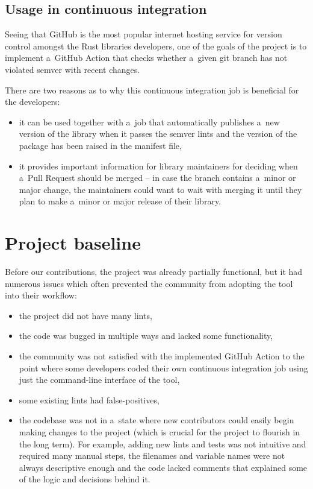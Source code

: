\documentclass[licencjacka,en]{pracamgr}
\begin{document}
\subsection{Usage in continuous integration}\label{r:subsection_usage_in_ci}

Seeing that GitHub is the most popular internet hosting service for version control amongst the
Rust libraries developers, one of the goals of the project is to implement a~GitHub Action that
checks whether a~given git branch has not violated semver with recent changes.

There are two reasons as to why this continuous integration job is beneficial for the developers:
\begin{itemize}
	\item it can be used together with a~job that automatically publishes a~new version of the
		library when it passes the semver lints and the version of the package has been raised
		in the manifest file,
	\item it provides important information for library maintainers for deciding when a~Pull
		Request should be merged -- in case the branch contains a~minor or major change, the
		maintainers could want to wait with merging it until they plan to make a~minor or major
		release of their library.
\end{itemize}


\section{Project baseline}\label{r:section_project_baseline}

Before our contributions, the project was already partially functional, but it had numerous issues
which often prevented the community from adopting the tool into their workflow:
\begin{itemize}
	\item the project did not have many lints,
	\item the code was bugged in multiple ways and lacked some functionality,
	\item the community was not satisfied with the implemented GitHub Action to the point
		where some developers coded their own continuous integration job using
		just the command-line interface of the tool,
	\item some existing lints had false-positives,
	\item the codebase was not in a~state where new contributors could easily begin making changes
		to the project (which is crucial for the project to flourish in the long term).
		For example, adding new lints and tests was not intuitive and required many manual steps,
		the filenames and variable names were not always descriptive enough and the code lacked
		comments that explained some of the logic and decisions behind it.
\end{itemize}
\end{document}
